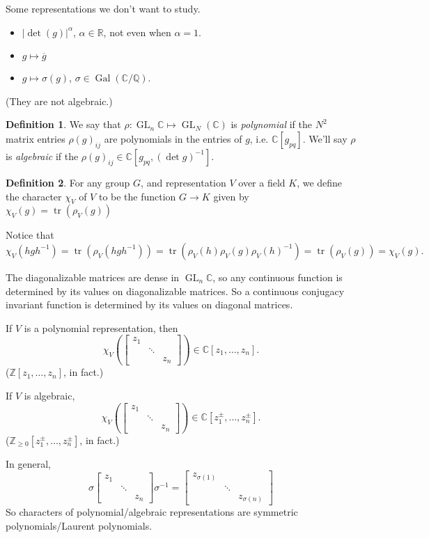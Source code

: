 \documentclass{report}
\newcommand{\R}{\mathbb{R}}
\newcommand{\C}{\mathbb{C}}
\newcommand{\Z}{\mathbb{Z}}
\newcommand{\Q}{\mathbb{Q}}
\def \tr {\operatorname{tr}}
\def \GL {\operatorname{GL}}
\def \Gal {\operatorname{Gal}}
\theoremstyle{definition}
\newtheorem{definition}{Definition}[section]
\theoremstyle{remark}
\numberwithin{equation}{section}
\begin{document}
Some representations we don't want to study.
\begin{itemize}
    \item $|\det(g)|^\alpha$, $\alpha \in \R$, not even when $\alpha = 1$.
    \item $g \mapsto \overline{g}$
    \item $g \mapsto \sigma(g)$, $\sigma \in \Gal(\C/\Q)$.
\end{itemize} (They are not algebraic.)

\begin{definition}
    We say that $\rho: \GL_n\C \mapsto \GL_N(\C)$ is \emph{polynomial} if the $N^2$ matrix entries $\rho(g)_{ij}$ are polynomials in the entries of $g$, i.e. $\C[g_{pq}]$. We'll say $\rho$ is \emph{algebraic} if the $\rho(g)_{ij} \in \C[g_{pq}, (\det g)^{-1}]$.
\end{definition}

\begin{definition}
    For any group $G$, and representation $V$ over a field $K$, we define the character $\chi_V$ of $V$ to be the function $G \to K$ given by $\chi_V(g) = \tr(\rho_V(g))$
\end{definition}

Notice that \[\chi_V(hgh^{-1}) = \tr(\rho_V(hgh^{-1})) = \tr(\rho_V(h)\rho_V(g)\rho_V(h)^{-1}) = \tr(\rho_V(g)) = \chi_V(g).\]

The diagonalizable matrices are dense in $\GL_n\C$, so any continuous function is determined by its values on diagonalizable matrices. So a continuous conjugacy invariant function is determined by its values on diagonal matrices.

If $V$ is a polynomial representation, then \[\chi_V\left(\begin{bmatrix}
    z_1 &  & \\
    & \ddots & \\
    & & z_n
\end{bmatrix}\right) \in \C[z_1, \ldots, z_n].\] ($\Z[z_1, \ldots, z_n]$, in fact.) 

If $V$ is algebraic, \[\chi_V\left(\begin{bmatrix}
    z_1 &  & \\
    & \ddots & \\
    & & z_n
\end{bmatrix}\right) \in \C[z_1^{\pm}, \ldots, z_n^{\pm}].\] ($\Z_{\geq 0}[z_1^{\pm}, \ldots, z_n^{\pm}]$, in fact.)

In general, \[
    \sigma \begin{bmatrix}
        z_1 &  & \\
        & \ddots & \\
        & & z_n
    \end{bmatrix} \sigma^{-1} = \begin{bmatrix}
        z_{\sigma(1)} &  & \\
        & \ddots & \\
        & & z_{\sigma(n)}
    \end{bmatrix} 
\]
So characters of polynomial/algebraic representations are symmetric polynomials/Laurent polynomials.
\end{document}
